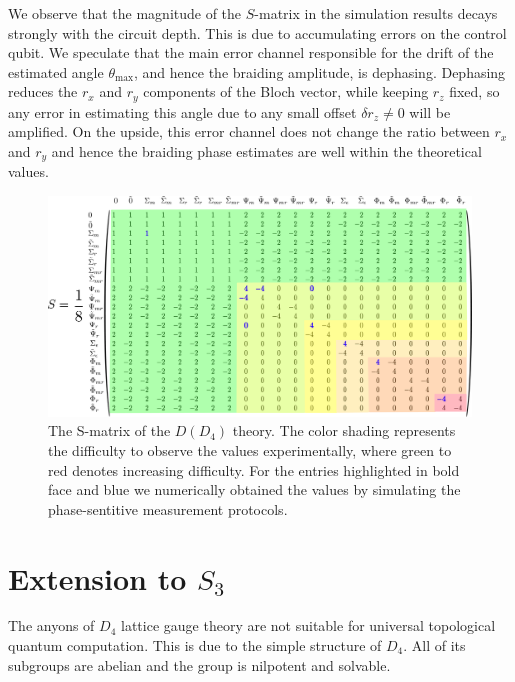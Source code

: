 \documentclass[a4paper,twocolumn,11pt]{quantumarticle}
\begin{document}
We observe that the magnitude of the $S$-matrix in the simulation results decays strongly with the circuit depth. This is due to accumulating errors on the control qubit. We speculate that the main error channel responsible for the drift of the estimated angle $\theta_{\text{max}}$, and hence the braiding amplitude, is dephasing. Dephasing reduces the $r_x$ and $r_y$ components of the Bloch vector, while keeping $r_z$ fixed, so any error in estimating this angle due to any small offset $\delta r_z \neq 0$ will be amplified. On the upside, this error channel does not change the ratio between $r_x$ and $r_y$ and hence the braiding phase estimates are well within the theoretical values.



 



\begin{figure}
	\centering
	\includegraphics[width=\textwidth]{Figures/S_mat_with_diff.pdf}
	\caption{The S-matrix of the $D(D_4)$ theory. The color shading represents the difficulty to observe the values experimentally, where green to red denotes increasing difficulty. For the entries highlighted in bold face and blue we numerically obtained the values by simulating the phase-sentitive measurement protocols.}
	\label{fig:Smat_diff}
\end{figure}

\section{Extension to $S_3$}\label{sec:other_gauge}

The anyons of $D_4$ lattice gauge theory are not suitable for universal topological quantum computation.
This is due to the simple structure of $D_4$. All of its subgroups are abelian and the group is nilpotent and solvable. 
\end{document}
